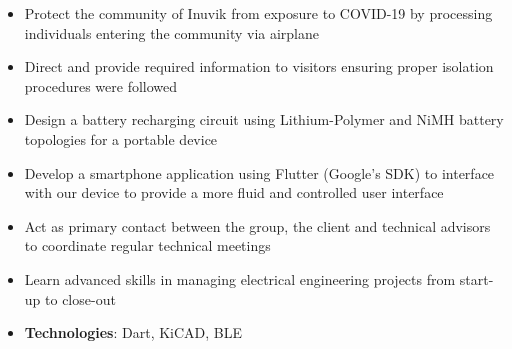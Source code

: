 \documentclass[10pt, letterpaper, ragged2e, withhyper]{altacv}
\begin{document}
\begin{paracol}{2}
            \begin{itemize}
                \item Protect the community of Inuvik from exposure to COVID-19 by processing individuals entering the community via airplane 
                \item Direct and provide required information to visitors ensuring proper isolation procedures were followed
            \end{itemize}

            
    
    \begin{itemize}
        \item Design a battery recharging circuit using Lithium-Polymer and NiMH battery topologies for a portable device 
        \item Develop a smartphone application using Flutter (Google's SDK) to interface with our device to provide a more fluid and 
        controlled user interface
        \item Act as primary contact between the group, the client and technical advisors to coordinate regular technical meetings 
        \item Learn advanced skills in managing electrical engineering projects from start-up to close-out
        \item \textbf{Technologies}: Dart, KiCAD, BLE
    \end{itemize}

\switchcolumn

     \\


\end{paracol}
\end{document}
